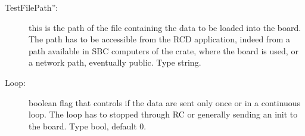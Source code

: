 \begin{description}
	\item[TestFilePath'':] this is the path of the file containing the data to
	be loaded into the board. The path has to be accessible from the RCD application,
 indeed	from a path available in SBC computers of the crate, where the board is used,
 or a network path, eventually public. Type string.
 
 \item[Loop:] boolean flag that controls if the data are sent only once or
 in a continuous loop. The loop has to stopped through RC or generally sending
 an init to the board. Type bool, default 0.
\end{description}